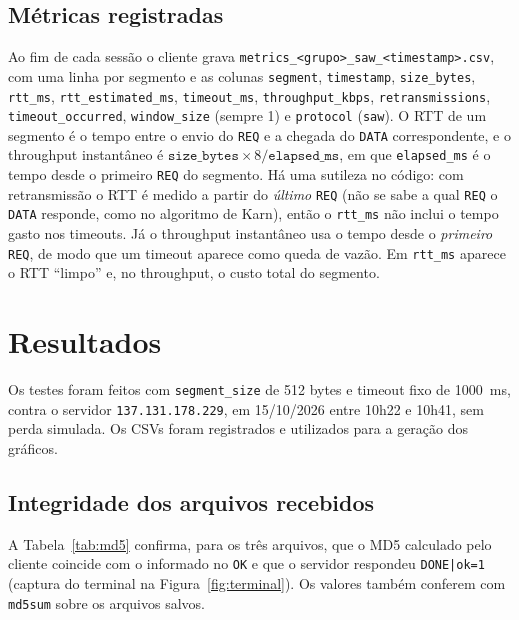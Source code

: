 \documentclass[11pt,a4paper]{article}
\begin{document}
\subsection{Métricas registradas}

Ao fim de cada sessão o cliente grava \texttt{metrics\_<grupo>\_saw\_<timestamp>.csv},
com uma linha por segmento e as colunas \texttt{segment}, \texttt{timestamp},
\texttt{size\_bytes}, \texttt{rtt\_ms}, \texttt{rtt\_estimated\_ms}, \texttt{timeout\_ms},
\texttt{throughput\_kbps}, \texttt{retransmissions}, \texttt{timeout\_occurred},
\texttt{window\_size} (sempre 1) e \texttt{protocol} (\texttt{saw}).
O RTT de um segmento é o tempo entre o envio do \texttt{REQ} e a chegada do
\texttt{DATA} correspondente, e o throughput instantâneo é
$\texttt{size\_bytes} \times 8 / \texttt{elapsed\_ms}$, em que \texttt{elapsed\_ms}
é o tempo desde o primeiro \texttt{REQ} do segmento.
Há uma sutileza no código: com retransmissão o RTT é medido a partir do \textit{último}
\texttt{REQ} (não se sabe a qual \texttt{REQ} o \texttt{DATA} responde, como no algoritmo
de Karn), então o \texttt{rtt\_ms} não inclui o tempo gasto nos timeouts. Já o throughput
instantâneo usa o tempo desde o \textit{primeiro} \texttt{REQ}, de modo que um timeout
aparece como queda de vazão. Em \texttt{rtt\_ms} aparece o RTT ``limpo'' e, no
throughput, o custo total do segmento.

\section{Resultados}

Os testes foram feitos com \texttt{segment\_size} de 512 bytes e timeout fixo
de 1000~ms, contra o servidor \texttt{137.131.178.229}, em 15/10/2026 entre 10h22 e 10h41,
sem perda simulada. Os CSVs foram registrados e utilizados para a geração dos gráficos.

\subsection{Integridade dos arquivos recebidos}

A Tabela~\ref{tab:md5} confirma, para os três arquivos, que o MD5 calculado pelo cliente
coincide com o informado no \texttt{OK} e que o servidor respondeu \texttt{DONE|ok=1}
(captura do terminal na Figura~\ref{fig:terminal}). Os valores também conferem com
\texttt{md5sum} sobre os arquivos salvos.
\end{document}
